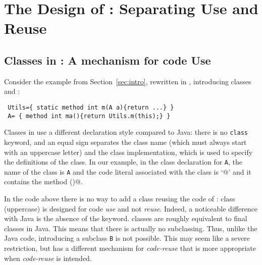 \saveSpace
\section{The Design of \name: Separating Use and Reuse}\label{sec:separate}

\subsection{Classes in \name: A mechanism for code Use}
\saveSpace
Consider the example from Section~\ref{sec:intro}, rewritten in \name, introducing classes \Q@Utils@ and \Q@A@:
\saveSpace\saveSpace
\begin{lstlisting}
 Utils={ static method int m(A a){return ...} }
 A= { method int ma(){return Utils.m(this);} }
\end{lstlisting} 
\saveSpace\saveSpace
\noindent Classes in \name use a different declaration style compared
to Java: there is no \lstinline{class} keyword, and an equal sign separates the class name (which must always start with
an uppercase letter) and the class implementation, which is used to specify the
definitions of the class. In our example, in the class declaration
for \lstinline{A}, the name of the class is \lstinline{A} and the code 
literal associated with the class is `@' and it contains the method \Q@ma()@.


In the \name code above there is no way to add a class 
\Q@B@ reusing the code of \Q@A@: class \Q@A@ (uppercase) is designed for code \emph{use} and not \emph{reuse}.
Indeed, a noticeable difference with Java is the
absence of the \Q@extends@ keyword.
\name classes are roughly equivalent to final classes in Java. This means that there is actually no subclassing.
Thus, unlike the Java code, introducing a subclass
\lstinline{B} is not possible. This may seem like a severe restriction, but
\name has a different mechanism for \emph{code-reuse} that 
is more appropriate when \emph{code-reuse} is intended. 

